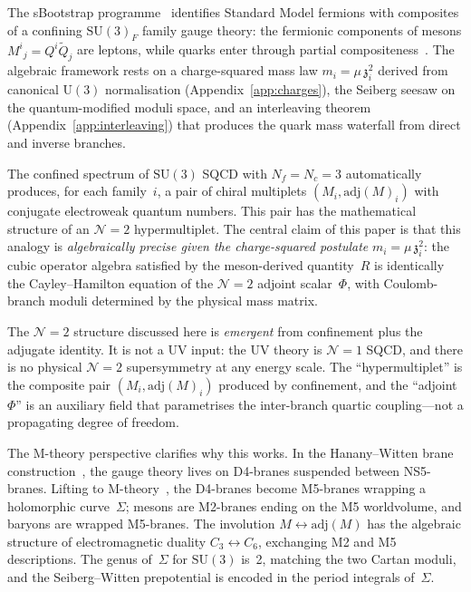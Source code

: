 \documentclass[aps,prd,twocolumn,showpacs,preprintnumbers,superscriptaddress,floatfix]{revtex4-2}
\newcommand{\SU}{\mathrm{SU}}
\newcommand{\UU}{\mathrm{U}}
\newcommand{\Nf}{N_{\!f}}
\newcommand{\Nc}{N_{\!c}}
\newcommand{\adj}{\mathrm{adj}}
\newcommand{\zch}{\mathfrak{z}}
\begin{document}
The sBootstrap programme~\cite{Rivero:2024epjc} identifies Standard
Model fermions with composites of a confining $\SU(3)_F$ family gauge
theory: the fermionic components of mesons $M^i{}_j = Q^i\tilde{Q}_j$
are leptons, while quarks enter through partial
compositeness~\cite{Kaplan:1991dc}.
The algebraic framework rests on a charge-squared mass law
$m_i = \mu\,\zch_i^2$ derived from canonical $\UU(3)$ normalisation
(Appendix~\ref{app:charges}), the Seiberg seesaw on the
quantum-modified moduli space, and an interleaving theorem
(Appendix~\ref{app:interleaving}) that produces the quark mass
waterfall from direct and inverse branches.

The confined spectrum of $\SU(3)$ SQCD with $\Nf = \Nc = 3$
automatically produces, for each family~$i$, a pair of chiral
multiplets $(M_i, \adj(M)_i)$ with conjugate electroweak quantum
numbers.
This pair has the mathematical structure of an $\mathcal{N}{=}2$
hypermultiplet.
The central claim of this paper is that this analogy is
\emph{algebraically precise given the charge-squared postulate}
$m_i = \mu\,\zch_i^2$: the cubic operator algebra satisfied by
the meson-derived quantity~$R$ is identically the Cayley--Hamilton
equation of the $\mathcal{N}{=}2$ adjoint scalar~$\Phi$, with
Coulomb-branch moduli determined by the physical mass matrix.

The $\mathcal{N}{=}2$ structure discussed here is \emph{emergent}
from confinement plus the adjugate identity.
It is not a UV input: the UV theory is $\mathcal{N}{=}1$ SQCD,
and there is no physical $\mathcal{N}{=}2$ supersymmetry at any
energy scale.
The ``hypermultiplet'' is the composite pair $(M_i, \adj(M)_i)$
produced by confinement, and the ``adjoint $\Phi$'' is an auxiliary
field that parametrises the inter-branch quartic coupling---not a
propagating degree of freedom.

The M-theory perspective clarifies why this works.
In the Hanany--Witten brane construction~\cite{HananyWitten:1997},
the gauge theory lives on D4-branes suspended between NS5-branes.
Lifting to M-theory~\cite{Witten:1997sc}, the D4-branes become
M5-branes wrapping a holomorphic curve~$\Sigma$; mesons are
M2-branes ending on the M5 worldvolume, and baryons are wrapped
M5-branes.
The involution $M \leftrightarrow \adj(M)$ has the algebraic
structure of electromagnetic duality
$C_3 \leftrightarrow C_6$, exchanging M2 and M5 descriptions.
The genus of~$\Sigma$ for $\SU(3)$ is~2, matching the two Cartan
moduli, and the Seiberg--Witten prepotential is encoded in the
period integrals of~$\Sigma$.
\end{document}
